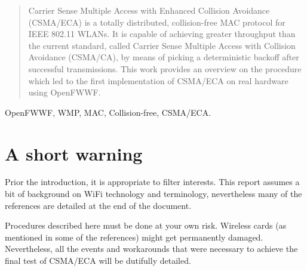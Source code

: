 \documentclass[conference]{IEEEtran}
\begin{document}
\begin{abstract}

\boldmath Carrier Sense Multiple Access with Enhanced Collision Avoidance (CSMA/ECA) is a totally distributed, collision-free MAC protocol for IEEE 802.11 WLANs. It is capable of achieving greater throughput than the current standard, called Carrier Sense Multiple Access with Collision Avoidance (CSMA/CA), by means of picking a deterministic backoff after successful transmissions. This work provides an overview on the procedure which led to the first implementation of CSMA/ECA on real hardware using OpenFWWF.


\end{abstract}

\begin{IEEEkeywords}
OpenFWWF, WMP, MAC, Collision-free, CSMA/ECA.
\end{IEEEkeywords}

\section*{A short warning} \label{warning}
Prior the introduction, it is appropriate to filter interests. This report assumes a bit of background on WiFi technology and terminology, nevertheless many of the references are detailed at the end of the document.

Procedures described here must be done at your own risk. Wireless cards (as mentioned in some of the references) might get permanently damaged. Nevertheless, all the events and workarounds that were necessary to achieve the final test of CSMA/ECA will be dutifully detailed.
\end{document}
